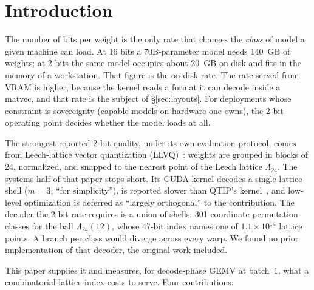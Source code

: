 \section{Introduction}
\label{sec:intro}

The number of bits per weight is the only rate that changes the \emph{class}
of model a given machine can load. At 16 bits a 70B-parameter model needs
140~GB of weights; at 2 bits the same model occupies about 20~GB on disk and
fits in the memory of a workstation. That figure is the on-disk rate. The
rate served from VRAM is higher, because the kernel reads a format it can
decode inside a matvec, and that rate is the subject of \S\ref{sec:layouts}.
For deployments whose constraint is sovereignty (capable models on hardware
one owns), the 2-bit operating point decides whether the model loads at all.

The strongest reported 2-bit quality, under its own evaluation protocol,
comes from Leech-lattice vector quantization (LLVQ)~\citep{llvq2026}: weights are grouped in blocks of 24,
normalized, and snapped to the nearest point of the Leech lattice
$\Lambda_{24}$. The systems half of that paper stops short. Its CUDA kernel
decodes a single lattice shell ($m=3$, ``for simplicity''), is reported
slower than QTIP's kernel~\citep{qtip2024}, and low-level optimization is
deferred as ``largely orthogonal'' to the contribution. The decoder the
2-bit rate requires is a union of shells: 301 coordinate-permutation
classes for the ball $\Lambda_{24}(12)$, whose 47-bit index names one of
$1.1\times10^{14}$ lattice points. A branch per class would diverge across
every warp. We found no prior implementation of that decoder, the original
work included.

This paper supplies it and measures, for decode-phase GEMV at batch~1, what
a combinatorial lattice index costs to serve. Four contributions:

